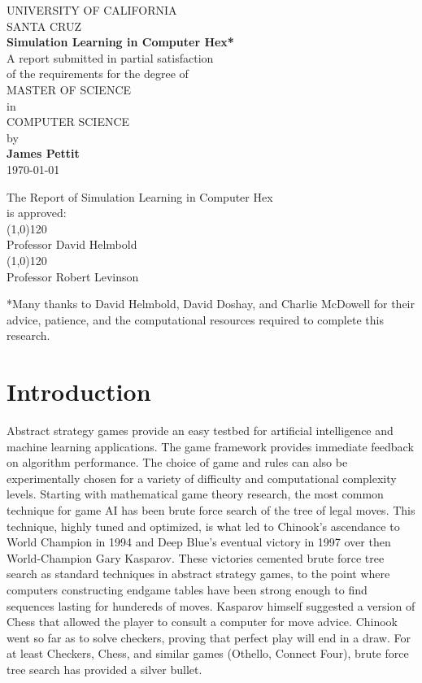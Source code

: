 \documentclass[10pt,a4paper]{report}
\begin{document}
\begin{titlepage}
\begin{center}
UNIVERSITY OF CALIFORNIA\\[0.5cm]
SANTA CRUZ\\[0.75cm]
\textbf{Simulation Learning in Computer Hex*}\\[0.5cm]
\small{A report submitted in partial satisfaction}\\
\small{of the requirements for the degree of}\\[0.5cm]
MASTER OF SCIENCE\\[0.5cm]
in\\[0.5cm]
COMPUTER SCIENCE\\[0.5cm]
by\\[0.5cm]
\textbf{James Pettit}\\[0.5cm]
\today
\end{center}
\vfill
\begin{flushright}
The Report of Simulation Learning in Computer Hex\\
is approved:\\[1cm]
\line(1,0){120}\\
Professor David Helmbold\\[1cm]
\line(1,0){120}\\
Professor Robert Levinson\\[3cm]
\end{flushright}
\small{*Many thanks to David Helmbold, David Doshay, and Charlie McDowell for their advice, patience, and the computational resources required to complete this research.}
\end{titlepage}

\tableofcontents

\renewcommand*\thesection{\arabic{section}}

\section{Introduction}
Abstract strategy games provide an easy testbed for artificial intelligence and machine learning applications. The game framework provides immediate feedback on algorithm performance. The choice of game and rules can also be experimentally chosen for a variety of difficulty and computational complexity levels. Starting with mathematical game theory research, the most common technique for game AI has been brute force search of the tree of legal moves. This technique, highly tuned and optimized, is what led to Chinook's ascendance to World Champion in 1994 and Deep Blue's eventual victory in 1997 over then World-Champion Gary Kasparov. These victories cemented brute force tree search as standard techniques in abstract strategy games, to the point where computers constructing endgame tables have been strong enough to find sequences lasting for hundereds of moves. Kasparov himself suggested a version of Chess that allowed the player to consult a computer for move advice. Chinook went so far as to solve checkers, proving that perfect play will end in a draw. For at least Checkers, Chess, and similar games (Othello, Connect Four), brute force tree search has provided a silver bullet.
\end{document}
